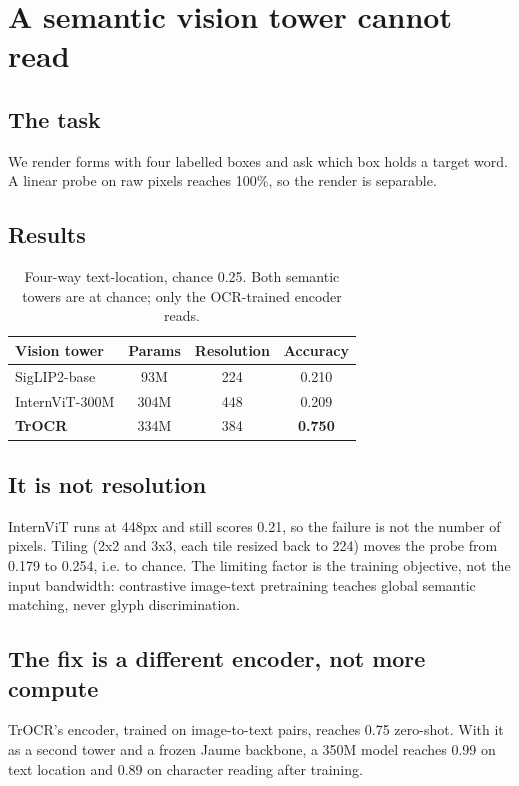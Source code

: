 \documentclass[10pt,twocolumn,letterpaper]{article}
\begin{document}
\section{A semantic vision tower cannot read}
\label{sec:ocr}

\subsection{The task}

We render forms with four labelled boxes and ask which box holds a target
word. A linear probe on raw pixels reaches 100\%, so the render is separable.

\subsection{Results}

\begin{table}[t]
\centering
\small
\begin{tabular}{lccc}
\toprule
Vision tower & Params & Resolution & Accuracy \\
\midrule
SigLIP2-base   & 93M  & 224 & 0.210 \\
InternViT-300M & 304M & 448 & 0.209 \\
\textbf{TrOCR} & 334M & 384 & \textbf{0.750} \\
\bottomrule
\end{tabular}
\caption{Four-way text-location, chance 0.25. Both semantic towers are at
chance; only the OCR-trained encoder reads.}
\label{tab:ocr}
\end{table}

\subsection{It is not resolution}

InternViT runs at 448px and still scores 0.21, so the failure is not the
number of pixels. Tiling (2x2 and 3x3, each tile resized back to 224) moves
the probe from 0.179 to 0.254, i.e. to chance. The limiting factor is the
training objective, not the input bandwidth: contrastive image-text
pretraining teaches global semantic matching, never glyph discrimination.

\subsection{The fix is a different encoder, not more compute}

TrOCR's encoder, trained on image-to-text pairs, reaches 0.75 zero-shot. With
it as a second tower and a frozen Jaume backbone, a 350M model reaches 0.99 on
text location and 0.89 on character reading after training.
\end{document}
